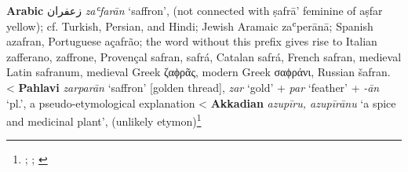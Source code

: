 \begin{etymology}\label{ety:zafaran}
\textbf{Arabic} {زعفران} \textit{zaʿfarān} `saffron', (not connected with ṣafrā' feminine of aṣfar yellow); cf. Turkish, Persian, and Hindi; Jewish Aramaic zaʿperānā; Spanish azafran, Portuguese açafrão; the word without this prefix gives rise to Italian zafferano, zaffrone, Provençal safran, safrá, Catalan safrá, French safran, medieval Latin safranum, medieval Greek ζαϕρᾶς, modern Greek σαϕράνι, Russian šafran. 
< \textbf{Pahlavi} \textit{zarparān} `saffron' [golden thread], \textit{zar} `gold' + \textit{par} `feather' + \textit{-ān} `pl.', a pseudo-etymological explanation
< \textbf{Akkadian} {} \textit{azupīru, azupīrānu} `a spice and medicinal plant', (unlikely etymon)\footnote{\textcite{wehr_dictionary_1976}; \textcites[]{asbaghi_persische_1988}[65, 98]{mackenzie_concise_1986}[safran]{ns}; \textcites[33]{black_concise_2000}[vol. 2, 530-531]{roth_assyrian_2004}}
\end{etymology}
